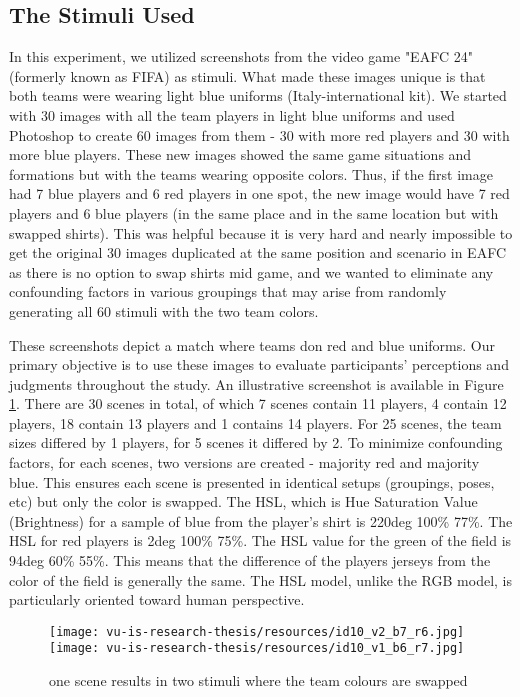 \subsection{The Stimuli Used}
In this experiment, we utilized screenshots from the video game "EAFC 24" (formerly known as FIFA) as stimuli.
What made these images unique is that both teams were wearing light blue uniforms (Italy-international kit). We started with 30 images with all the team players in light blue uniforms and used Photoshop to create 60 images from them - 30 with more red players and 30 with more blue players. These new images showed the same game situations and formations but with the teams wearing opposite colors. Thus, if the first image had 7 blue players and 6 red players in one spot, the new image would have 7 red players and 6 blue players (in the same place and in the same location but with swapped shirts). This was helpful because it is very hard and nearly impossible to get the original 30 images duplicated at the same position and scenario in EAFC as there is no option to swap shirts mid game, and we wanted to eliminate any confounding factors in various groupings that may arise from randomly generating all 60 stimuli with the two team colors.

These screenshots depict a match where teams don red and blue uniforms. Our primary objective is to use these images to evaluate participants' perceptions and judgments throughout the study. An illustrative screenshot is available in Figure \ref{fitness1}. There are 30 scenes in total, of which 7 scenes contain 11 players, 4 contain 12 players, 18 contain 13 players and 1 contains 14 players. For 25 scenes, the team sizes differed by 1 players, for 5 scenes it differed by 2. 
To minimize confounding factors, for each scenes, two versions are created - majority red and majority blue. This ensures each scene is presented in identical setups (groupings, poses, etc) but only the color is swapped. The HSL, which is Hue Saturation Value (Brightness) for a sample of blue from the player's shirt is 220deg 100\% 77\%. The HSL for red players is 2deg 100\% 75\%. The HSL value for the green of the field is 94deg 60\% 55\%. This means that the difference of the players jerseys from the color of the field is generally the same. The HSL model, unlike the RGB model, is particularly oriented toward human perspective. 

\begin{figure}[h!]
    \texttt{[image: vu-is-research-thesis/resources/id10\_v2\_b7\_r6.jpg]}
    \texttt{[image: vu-is-research-thesis/resources/id10\_v1\_b6\_r7.jpg]}
    \centering 
   \caption{one scene results in two stimuli where the team colours are swapped}
   \label{fitness1}
\end{figure}

